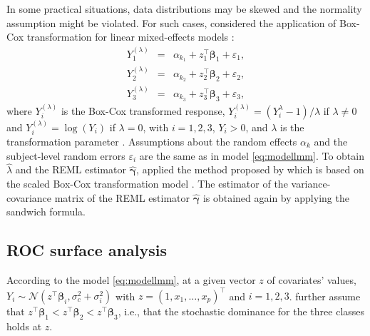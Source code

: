 In some practical situations, data distributions may be skewed and the {normality assumption} might be violated. For such cases, \citet{khanh2022} considered the application of Box-Cox transformation for linear {mixed-effects} models
\citep{lipsitz2000using, gurka2006extending}: 
\begin{eqnarray}
    Y^{(\lambda)}_{1} &=& \alpha_{k_1} + z_1^\top \boldsymbol{\beta}_1 + \varepsilon_{1}, \nonumber \\
    Y^{(\lambda)}_{2} &=& \alpha_{k_2} + z_2^\top \boldsymbol{\beta}_2 + \varepsilon_{2}, \label{eq:modellmmbxc} \\
    Y^{(\lambda)}_{3} &=& \alpha_{k_3} + z_3^\top \boldsymbol{\beta}_3 + \varepsilon_{3}, \nonumber
\end{eqnarray} 
where $Y^{(\lambda)}_{i}$ is the Box-Cox transformed response, $Y^{(\lambda)}_{i} = (Y^{\lambda}_{i} - 1)/\lambda$ if $\lambda \ne 0$ and $Y^{(\lambda)}_{i} = \log(Y_{i})$ if $\lambda = 0$, with $i = 1,2,3$, $Y_{i} > 0$, and $\lambda$ is the transformation parameter \citep{box1964analysis}. Assumptions about the random effects $\alpha_{k}$ and the subject-level random errors $\varepsilon_{i}$ are the same as in model \eqref{eq:modellmm}. To obtain $\widehat{\lambda}$ and the REML estimator $\widehat{\boldsymbol{\gamma}}$, \citet{khanh2022} applied the method proposed by \citet{gurka2011estimating} which is based on the scaled Box-Cox transformation model \citep{gurka2006extending}. The estimator of the variance-covariance matrix of the REML estimator $\widehat{\boldsymbol{\gamma}}$ is obtained again by applying the sandwich formula.

\hypertarget{roc-surface-analysis}{%
\subsection{ROC surface analysis}\label{roc-surface-analysis}}

According to the model \eqref{eq:modellmm}, at a given vector $z$ of covariates' values, $Y_i \sim \mathcal{N}(z^\top \boldsymbol{\beta}_i, \sigma^2_c + \sigma^2_i)$ with $z = (1, x_{1}, \ldots, x_{p})^\top$ and $i = 1, 2, 3$. \citet{khanh2022} further assume that $z^\top \boldsymbol{\beta}_1 < z^\top \boldsymbol{\beta}_2 < z^\top \boldsymbol{\beta}_3$, i.e., that the stochastic dominance for the three classes holds at $z$.

